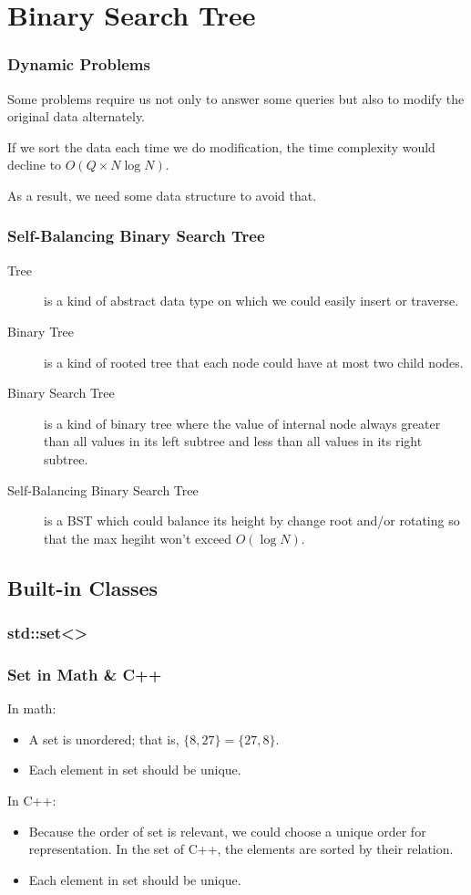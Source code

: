 \documentclass{beamer}
\begin{document}
\section{Binary Search Tree}

\frame
{
	\frametitle{Dynamic Problems}
	
	Some problems require us not only to answer some queries but also to modify the original data alternately.
	
	If we sort the data each time we do modification, the time complexity would decline to $O(Q\times N\log N)$.
	
	As a result, we need some data structure to avoid that.
}

\frame
{
	\frametitle{Self-Balancing Binary Search Tree}
	
	\begin{description}
		\item[Tree] is a kind of abstract data type on which we could easily insert or traverse.\pause
		\item[Binary Tree] is a kind of rooted tree that each node could have at most two child nodes.\pause
		\item[Binary Search Tree] is a kind of binary tree where the value of internal node always greater than all values in its left subtree and less than all values in its right subtree.\pause
		\item[Self-Balancing Binary Search Tree] is a BST which could balance its height by change root and/or rotating so that the max hegiht won't exceed $O(\log N)$.
	\end{description}
}

\subsection{Built-in Classes}

\subsubsection{std::set<>}

\frame
{
	\frametitle{Set in Math \& C++}
	
	In math:
	\begin{itemize}
		\item<1-> A set is unordered; that is, $\{8, 27\} = \{27, 8\}$.
		\item<2-> Each element in set should be unique.
	\end{itemize}
	
	In C++:
	\begin{itemize}
		\item<1-> Because the order of set is relevant, we could choose a unique order for representation. In the set of C++, the elements are sorted by their relation.
		\item<2-> Each element in set should be unique.
	\end{itemize}
}
\end{document}
